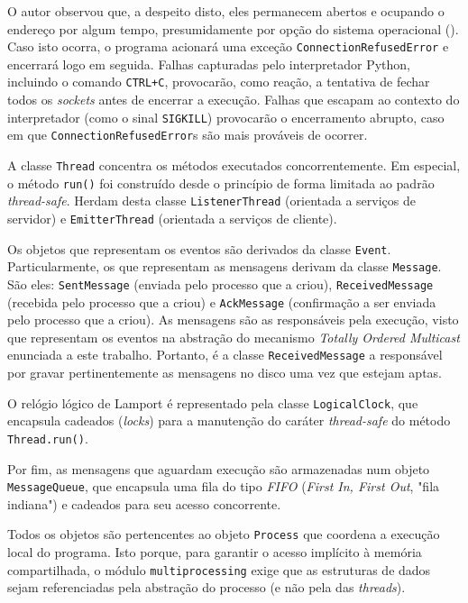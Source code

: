\documentclass[a4paper,12pt]{article}
\begin{document}
        O autor observou que, a despeito disto, eles permanecem abertos e ocupando o endereço por algum tempo, presumidamente por opção do sistema operacional (\cite{WEBSITE:9}).
        Caso isto ocorra, o programa acionará uma exceção \texttt{ConnectionRefusedError} e encerrará logo em seguida.
        Falhas capturadas pelo interpretador Python, incluindo o comando \texttt{CTRL+C}, provocarão, como reação, a tentativa de fechar todos os \emph{sockets} antes de encerrar a execução.
        Falhas que escapam ao contexto do interpretador (como o sinal \texttt{SIGKILL}) provocarão o encerramento abrupto, caso em que \texttt{ConnectionRefusedError}s são mais prováveis de ocorrer. 

        A classe \texttt{Thread} concentra os métodos executados concorrentemente.
        Em especial, o método \texttt{run()} foi construído desde o princípio de forma limitada ao padrão \emph{thread-safe}.
        Herdam desta classe \texttt{ListenerThread} (orientada a serviços de servidor) e \texttt{EmitterThread} (orientada a serviços de cliente).

        Os objetos que representam os eventos são derivados da classe \texttt{Event}.
        Particularmente, os que representam as mensagens derivam da classe \texttt{Message}.
        São eles: \texttt{SentMessage} (enviada pelo processo que a criou), \texttt{ReceivedMessage} (recebida pelo processo que a criou) e \texttt{AckMessage} (confirmação a ser enviada pelo processo que a criou).
        As mensagens são as responsáveis pela execução, visto que representam os eventos na abstração do mecanismo \emph{Totally Ordered Multicast} enunciada a este trabalho.
        Portanto, é a classe \texttt{ReceivedMessage} a responsável por gravar pertinentemente as mensagens no disco uma vez que estejam aptas.

        O relógio lógico de Lamport é representado pela classe \texttt{LogicalClock}, que encapsula cadeados (\emph{locks}) para a manutenção do caráter \emph{thread-safe} do método \texttt{Thread.run()}.

        Por fim, as mensagens que aguardam execução são armazenadas num objeto \texttt{MessageQueue}, que encapsula uma fila do tipo \emph{FIFO} (\emph{First In, First Out}, "fila indiana") e cadeados para seu acesso concorrente.

        Todos os objetos são pertencentes ao objeto \texttt{Process} que coordena a execução local do programa.
        Isto porque, para garantir o acesso implícito à memória compartilhada, o módulo \texttt{multiprocessing} exige que as estruturas de dados sejam referenciadas pela abstração do processo (e não pela das \emph{threads}).
\end{document}

